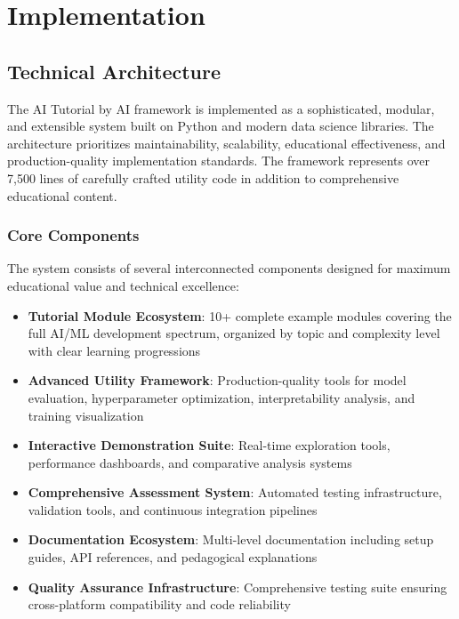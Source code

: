 \section{Implementation}
\label{sec:implementation}

\subsection{Technical Architecture}

The AI Tutorial by AI framework is implemented as a sophisticated, modular, and extensible system built on Python and modern data science libraries. The architecture prioritizes maintainability, scalability, educational effectiveness, and production-quality implementation standards. The framework represents over 7,500 lines of carefully crafted utility code in addition to comprehensive educational content.

\subsubsection{Core Components}

The system consists of several interconnected components designed for maximum educational value and technical excellence:

\begin{itemize}
    \item \textbf{Tutorial Module Ecosystem}: 10+ complete example modules covering the full AI/ML development spectrum, organized by topic and complexity level with clear learning progressions
    \item \textbf{Advanced Utility Framework}: Production-quality tools for model evaluation, hyperparameter optimization, interpretability analysis, and training visualization
    \item \textbf{Interactive Demonstration Suite}: Real-time exploration tools, performance dashboards, and comparative analysis systems
    \item \textbf{Comprehensive Assessment System}: Automated testing infrastructure, validation tools, and continuous integration pipelines
    \item \textbf{Documentation Ecosystem}: Multi-level documentation including setup guides, API references, and pedagogical explanations
    \item \textbf{Quality Assurance Infrastructure}: Comprehensive testing suite ensuring cross-platform compatibility and code reliability
\end{itemize}

